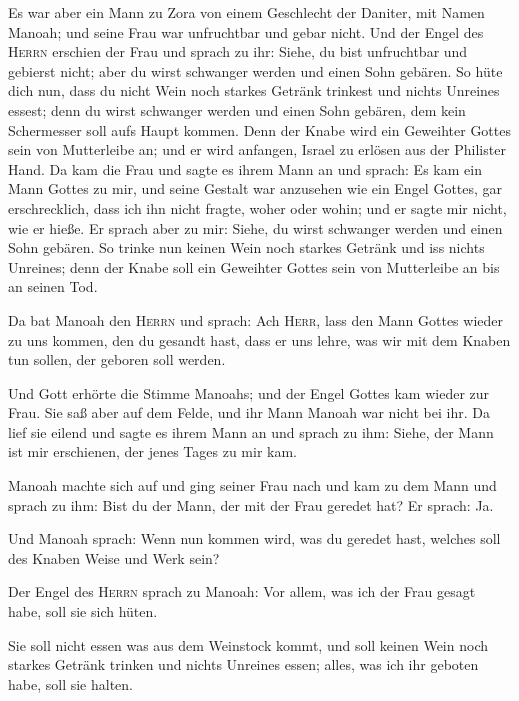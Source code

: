  Es war aber ein Mann zu Zora von einem Geschlecht der
Daniter, mit Namen Manoah; und seine Frau war unfruchtbar und gebar
nicht.  Und der Engel des \textsc{Herrn} erschien der Frau
und sprach zu ihr: Siehe, du bist unfruchtbar und gebierst nicht; aber
du wirst schwanger werden und einen Sohn gebären.  So hüte
dich nun, dass du nicht Wein noch starkes Getränk trinkest und nichts
Unreines essest;  denn du wirst schwanger werden und einen
Sohn gebären, dem kein Schermesser soll aufs Haupt kommen. Denn der
Knabe wird ein Geweihter Gottes sein von Mutterleibe an; und er wird
anfangen, Israel zu erlösen aus der Philister Hand.  Da
kam die Frau und sagte es ihrem Mann an und sprach: Es kam ein Mann
Gottes zu mir, und seine Gestalt war anzusehen wie ein Engel Gottes, gar
erschrecklich, dass ich ihn nicht fragte, woher oder wohin; und er sagte
mir nicht, wie er hieße.  Er sprach aber zu mir: Siehe, du
wirst schwanger werden und einen Sohn gebären. So trinke nun keinen Wein
noch starkes Getränk und iss nichts Unreines; denn der Knabe soll ein
Geweihter Gottes sein von Mutterleibe an bis an seinen Tod.

 Da bat Manoah den \textsc{Herrn} und sprach: Ach
\textsc{Herr}, lass den Mann Gottes wieder zu uns kommen, den du gesandt
hast, dass er uns lehre, was wir mit dem Knaben tun sollen, der geboren
soll werden.

 Und Gott erhörte die Stimme Manoahs; und der Engel Gottes
kam wieder zur Frau. Sie saß aber auf dem Felde, und ihr Mann Manoah war
nicht bei ihr.  Da lief sie eilend und sagte es ihrem
Mann an und sprach zu ihm: Siehe, der Mann ist mir erschienen, der jenes
Tages zu mir kam.

 Manoah machte sich auf und ging seiner Frau nach und kam
zu dem Mann und sprach zu ihm: Bist du der Mann, der mit der Frau
geredet hat? Er sprach: Ja.

 Und Manoah sprach: Wenn nun kommen wird, was du geredet
hast, welches soll des Knaben Weise und Werk sein?

 Der Engel des \textsc{Herrn} sprach zu Manoah: Vor
allem, was ich der Frau gesagt habe, soll sie sich hüten.

 Sie soll nicht essen was aus dem Weinstock kommt, und
soll keinen Wein noch starkes Getränk trinken und nichts Unreines essen;
alles, was ich ihr geboten habe, soll sie halten.

